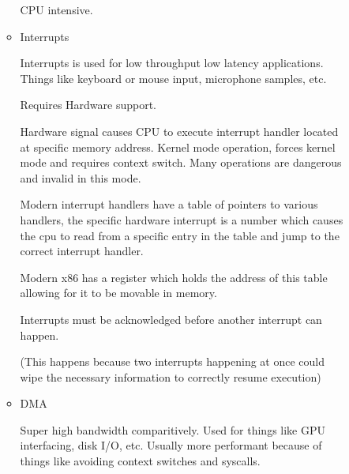 \documentclass{report}
\begin{document}
\begin{description}
\begin{itemize}
\begin{itemize}
\begin{mdframed}
                            CPU intensive.
                        \end{mdframed}
                    \item Interrupts
                        \begin{mdframed}
                            Interrupts is used for low throughput low
                            latency applications. Things like keyboard or mouse input,
                            microphone samples, etc.

                            Requires Hardware support.
                        \end{mdframed}
                        \begin{mdframed}
                            Hardware signal causes CPU to execute interrupt handler located at
                            specific memory address. Kernel mode operation, forces kernel mode
                            and requires context switch. Many operations are dangerous and invalid
                            in this mode.

                            Modern interrupt handlers have a table of pointers to various handlers,
                            the specific hardware interrupt is a number which causes the cpu to read
                            from a specific entry in the table and jump to the correct interrupt handler.

                            Modern x86 has a register which holds the address of this table allowing
                            for it to be movable in memory.

                            Interrupts must be acknowledged before another interrupt can happen.

                            (This happens because two interrupts happening at once could wipe the
                            necessary information to correctly resume execution)
                        \end{mdframed}
                    \item DMA
                        \begin{mdframed}
                            Super high bandwidth comparitively. Used for things like GPU
                            interfacing, disk I/O, etc. Usually more performant because
                            of things like avoiding context switches and syscalls.


\end{mdframed}
\end{itemize}
\end{itemize}
\end{description}
\end{document}
